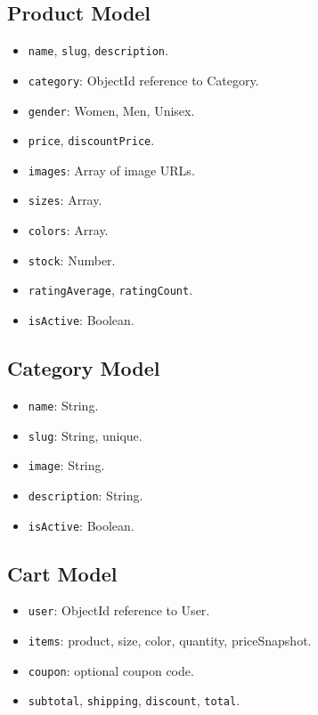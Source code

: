 \documentclass[11pt,a4paper]{article}
\begin{document}
\subsection{Product Model}

\begin{itemize}
  \item \texttt{name}, \texttt{slug}, \texttt{description}.
  \item \texttt{category}: ObjectId reference to Category.
  \item \texttt{gender}: Women, Men, Unisex.
  \item \texttt{price}, \texttt{discountPrice}.
  \item \texttt{images}: Array of image URLs.
  \item \texttt{sizes}: Array.
  \item \texttt{colors}: Array.
  \item \texttt{stock}: Number.
  \item \texttt{ratingAverage}, \texttt{ratingCount}.
  \item \texttt{isActive}: Boolean.
\end{itemize}

\subsection{Category Model}

\begin{itemize}
  \item \texttt{name}: String.
  \item \texttt{slug}: String, unique.
  \item \texttt{image}: String.
  \item \texttt{description}: String.
  \item \texttt{isActive}: Boolean.
\end{itemize}

\subsection{Cart Model}

\begin{itemize}
  \item \texttt{user}: ObjectId reference to User.
  \item \texttt{items}: product, size, color, quantity, priceSnapshot.
  \item \texttt{coupon}: optional coupon code.
  \item \texttt{subtotal}, \texttt{shipping}, \texttt{discount}, \texttt{total}.
\end{itemize}
\end{document}

